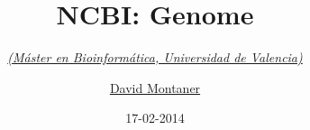 

\date{17-02-2014}
\title[\hspace{2em} NCBI Genome \hspace{12em} \insertframenumber\ / \inserttotalframenumber]{NCBI: Genome}

\subtitle{\href{http://www.uv.es/bioinfor/}{\color{gray}\textit{(Máster en Bioinformática, Universidad de Valencia)}}} %
\author[Nociones básicas de bioinformática y genómica \hspace{2em}]{\href{http://www.dmontaner.com}{David Montaner}}
